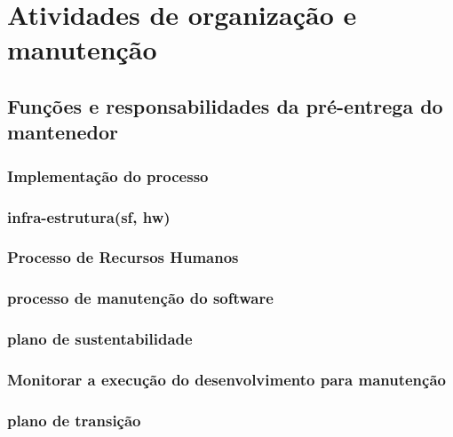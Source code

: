 \chapter{Atividades de organização e manutenção}

\section{Funções e responsabilidades da pré-entrega do mantenedor}

\subsection{Implementação do processo}

\subsection{infra-estrutura(sf, hw)}

\subsection{Processo de Recursos Humanos}

\subsection{processo de manutenção do software}

\subsection{plano de sustentabilidade }

\subsection{Monitorar a execução do desenvolvimento para manutenção}

\subsection{plano de transição}

